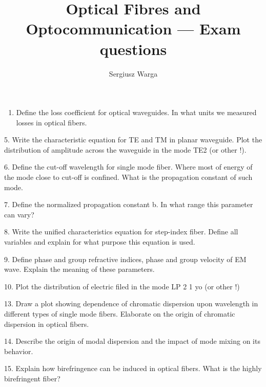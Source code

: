 \documentclass[a4paper]{article}
\title{Optical Fibres and Optocommunication --- Exam questions}
\author{Sergiusz Warga}
\begin{document}
\maketitle
\tableofcontents




\begin{enumerate}
    \item Define the loss coefficient for optical waveguides. In what units we measured losses in optical fibers.  
\end{enumerate}



5.	Write the characteristic equation for TE and  TM in planar waveguide. Plot the distribution of amplitude across the waveguide  in the mode TE2  (or other !).

6.	Define the cut-off wavelength for single mode fiber. Where most of energy of the mode close to cut-off is confined. What is the propagation constant of such mode. 

7.	Define the normalized propagation constant b. In what range this parameter can vary? 

8.	Write the unified characteristics equation for step-index fiber. Define all variables and explain for what purpose this equation is  used. 

9.	Define phase and group refractive indices, phase and group velocity of  EM wave. Explain the meaning of these parameters. 

10.	Plot the distribution of electric filed in the mode LP 2 1 yo  (or other !)





13.	Draw a plot showing dependence of chromatic dispersion upon wavelength in different types of single mode fibers. Elaborate on the origin of chromatic dispersion in optical fibers.  

14.	Describe the origin of modal dispersion and the impact of mode mixing on  its behavior.

15.	Explain how birefringence can be induced in optical fibers. What is the highly birefringent fiber? 



\end{document}
